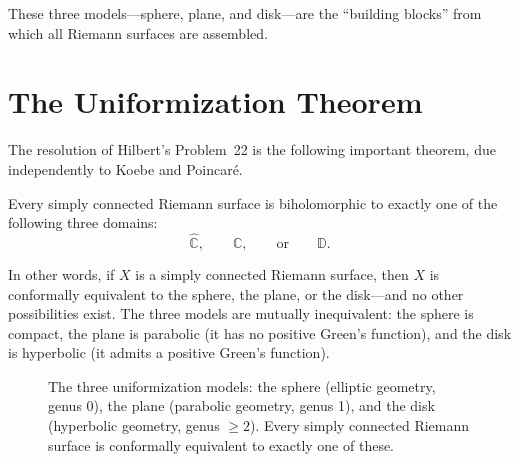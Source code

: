 These three models---sphere, plane, and disk---are the ``building blocks'' from which all Riemann surfaces are assembled.

\section{The Uniformization Theorem}

The resolution of Hilbert's Problem~22 is the following important theorem, due independently to Koebe and Poincar\'e.

\begin{theorem}
\label{thm:uniformization}
Every simply connected Riemann surface is biholomorphic to exactly one of the following three domains:
\[
    \widehat{\mathbb{C}}, \qquad \mathbb{C}, \qquad \text{or} \qquad \mathbb{D}.
\]
\end{theorem}

In other words, if $X$ is a simply connected Riemann surface, then $X$ is conformally equivalent to the sphere, the plane, or the disk---and no other possibilities exist. The three models are mutually inequivalent: the sphere is compact, the plane is parabolic (it has no positive Green's function), and the disk is hyperbolic (it admits a positive Green's function).

\begin{figure}[htbp]
\centering
{}
\caption{The three uniformization models: the sphere (elliptic geometry, genus 0), the plane (parabolic geometry, genus 1), and the disk (hyperbolic geometry, genus $\geq 2$). Every simply connected Riemann surface is conformally equivalent to exactly one of these.}
\label{fig:uniformization-models}
\end{figure}

